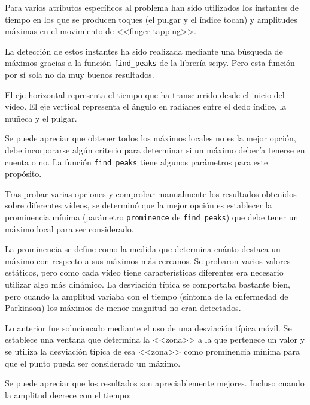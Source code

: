 Para varios atributos específicos al problema han sido utilizados los instantes
de tiempo en los que se producen toques (el pulgar y el índice tocan) y
amplitudes máximas en el movimiento de <<finger-tapping>>.

La detección de estos instantes ha sido realizada mediante una búsqueda de
máximos gracias a la función \texttt{find\_peaks} de la librería
\href{https://scipy.org/}{scipy}. Pero esta función por sí sola no da muy buenos
resultados.


El eje horizontal representa el tiempo que ha transcurrido desde el inicio del
vídeo. El eje vertical representa el ángulo en radianes entre el dedo índice, la
muñeca y el pulgar.

Se puede apreciar que obtener todos los máximos locales no es la mejor opción,
debe incorporarse algún criterio para determinar si un máximo debería tenerse en
cuenta o no. La función \texttt{find\_peaks} tiene algunos parámetros para este
propósito.

Tras probar varias opciones y comprobar manualmente los resultados obtenidos
sobre diferentes vídeos, se determinó que la mejor opción es establecer la
prominencia mínima (parámetro \texttt{prominence} de \texttt{find\_peaks}) que debe tener
un máximo local para ser considerado.

La prominencia se define como la medida que determina cuánto destaca un máximo
con respecto a sus máximos más cercanos. Se probaron varios valores estáticos,
pero como cada vídeo tiene características diferentes era necesario utilizar
algo más dinámico. La desviación típica se comportaba bastante bien, pero cuando
la amplitud variaba con el tiempo (síntoma de la enfermedad de Parkinson) los
máximos de menor magnitud no eran detectados.

Lo anterior fue solucionado  mediante el uso de una desviación típica móvil. Se
establece una ventana que determina la <<zona>> a la que pertenece un valor y se
utiliza la desviación típica de esa <<zona>> como prominencia mínima para que el
punto pueda ser considerado un máximo.


Se puede apreciar que los resultados son apreciablemente mejores. Incluso cuando
la amplitud decrece con el tiempo:

